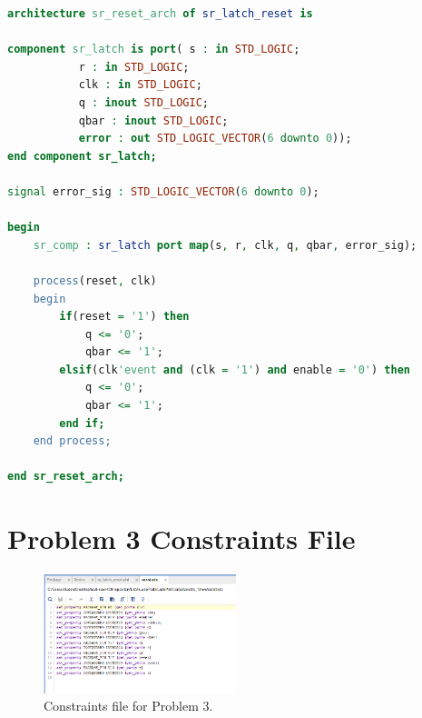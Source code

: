 \documentclass[11pt]{article}
\begin{document}
\begin{appendices}
\begin{lstlisting}[language=VHDL]
architecture sr_reset_arch of sr_latch_reset is

component sr_latch is port( s : in STD_LOGIC;
           r : in STD_LOGIC;
           clk : in STD_LOGIC;
           q : inout STD_LOGIC;
           qbar : inout STD_LOGIC;
           error : out STD_LOGIC_VECTOR(6 downto 0));
end component sr_latch;

signal error_sig : STD_LOGIC_VECTOR(6 downto 0);

begin
    sr_comp : sr_latch port map(s, r, clk, q, qbar, error_sig);
    
    process(reset, clk)
    begin
        if(reset = '1') then
            q <= '0';
            qbar <= '1';
        elsif(clk'event and (clk = '1') and enable = '0') then
            q <= '0';
            qbar <= '1';
        end if;
    end process;

end sr_reset_arch;
\end{lstlisting}

\section{Problem 3 Constraints File}
\begin{figure}[H]
\begin{center}
	\includegraphics[width=0.5\textwidth]{./images/Lab5Part3Const.png}
	\caption{\label{fig:Part3ConstFile}Constraints file for Problem 3.}
\end{center}
\end{figure}

\end{appendices}
\end{document}
